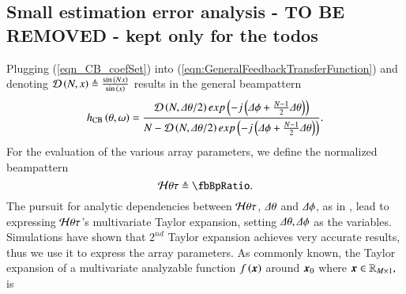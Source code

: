 \ifdefined\showTodo
{
    \subsection*{Small estimation error analysis - \textbf{TO BE REMOVED - kept only for the todos}}
    \label{subsection_ArrayPerformance_TayolrAnalysis}
    Plugging (\ref{eqn_CB_coefSet}) into (\ref{eqn:GeneralFeedbackTransferFunction}) and denoting $\mathcal{D}\left({N,x}\right) \triangleq \frac{\sin{\left({Nx}\right)}}{\sin{\left({x}\right)}}$ results in the general \coefSetName{} beampattern 
    \begin{equation*}
        h_{\text{CB}{}}\left({\theta,\omega}\right)
        =
        \frac{
        \mathcal{D}\left({N,\Delta\theta/2}\right)exp\left({-j\left({\Delta\phi+\frac{N-1}{2}\Delta\theta}\right)}\right)
        }{
        N - \mathcal{D}\left({N,\Delta\theta/2}\right)exp\left({-j\left({\Delta\phi+\frac{N-1}{2}\Delta\theta}\right)}\right)
        }.
    \end{equation*}
    For the evaluation of the various array parameters, we define the normalized beampattern 
    \begin{equation}
        \label{eqn_arrPerformance_beamwidth_3dB}
        \Hr{\theta}{\tau}{}\triangleq\fbBpRatio.
    \end{equation}
    The pursuit for analytic dependencies between $\mathcal{H}{\theta}{\tau}{}$, $\Delta\theta$ and $\Delta\phi$, as in \cite{VanTrees2002DetectionIV}, lead to expressing $\mathcal{H}{\theta}{\tau}{}$'s multivariate Taylor expansion, setting $\Delta\theta,\Delta\phi$ as the variables. Simulations have shown that $2^{nd}$ Taylor expansion achieves very accurate results, thus we use it to express the array parameters. As commonly known, the Taylor expansion of a multivariate analyzable function $f\left({\boldsymbol{x}}\right)$ around $\boldsymbol{x}_{0}$ where $\boldsymbol{x} \in \mathbb{R}_{M\times1},$ is 
}
